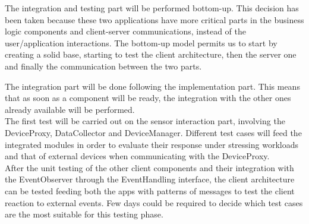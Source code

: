 {{}
The integration and testing part will be performed bottom-up. This decision has been taken because these two applications have more critical parts in the business logic components and client-server communications, instead of the user/application interactions. The bottom-up model permits us to start by creating a solid base, starting to test the client architecture, then the server one and finally the communication between the two parts.

{}
The integration part will be done following the implementation part. This means that as soon as a component will be ready, the integration with the other ones already available will be performed.\\
The first test will be carried out on the sensor interaction part, involving the DeviceProxy, DataCollector and DeviceManager. Different test cases will feed the integrated modules in order to evaluate their response under stressing workloads and that of external devices when communicating with the DeviceProxy. \\
After the unit testing of the other client components and their integration with the EventObserver through the EventHandling interface, the client architecture can be tested feeding both the apps with patterns of messages to test the client reaction to external events. Few days could be required to decide which test cases are the most suitable for this testing phase.

}
